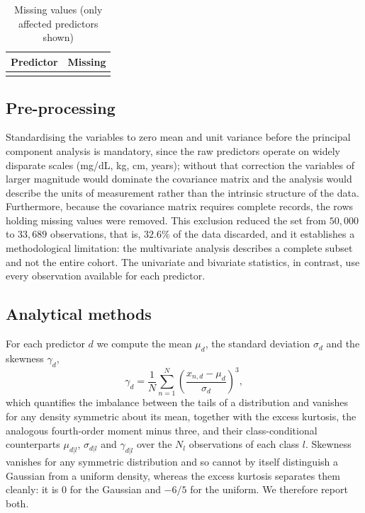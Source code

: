 \documentclass[conference]{IEEEtran}
\begin{document}
\begin{table}[htbp]
\caption{Missing values (only affected predictors shown)}
\label{tab:missing}
\centering
\begin{tabular}{lr}
\toprule
Predictor & Missing \\
\midrule
\\
\bottomrule
\end{tabular}
\end{table}

\subsection{Pre-processing}
\label{subsec:preproc}

Standardising the variables to zero mean and unit variance before the
principal component analysis is mandatory, since the raw predictors
operate on widely disparate scales (mg/dL, kg, cm, years); without
that correction the variables of larger magnitude would dominate the
covariance matrix and the analysis would describe the units of
measurement rather than the intrinsic structure of the data.
Furthermore, because the covariance matrix requires complete records,
the rows holding missing values were removed. This exclusion reduced
the set from $50{,}000$ to $33{,}689$ observations, that is, $32.6\%$
of the data discarded, and it establishes a methodological limitation:
the multivariate analysis describes a complete subset and not the
entire cohort. The univariate and bivariate statistics, in contrast,
use every observation available for each predictor.

\subsection{Analytical methods}
\label{subsec:methods}

For each predictor $d$ we compute the mean $\mu_d$, the standard
deviation $\sigma_d$ and the skewness $\gamma_d$,
\begin{equation}
\gamma_d = \frac{1}{N}\sum_{n=1}^{N}
\left(\frac{x_{n,d}-\mu_d}{\sigma_d}\right)^{3},
\label{eq:skew}
\end{equation}
which quantifies the imbalance between the tails of a distribution and
vanishes for any density symmetric about its mean,
together with the excess kurtosis, the analogous fourth-order moment
minus three, and their class-conditional counterparts $\mu_{d|l}$,
$\sigma_{d|l}$ and $\gamma_{d|l}$ over the $N_l$ observations of each
class $l$. Skewness vanishes for any symmetric distribution and so
cannot by itself distinguish a Gaussian from a uniform density, whereas
the excess kurtosis separates them cleanly: it is $0$ for the Gaussian
and $-6/5$ for the uniform. We therefore report both.
\end{document}
